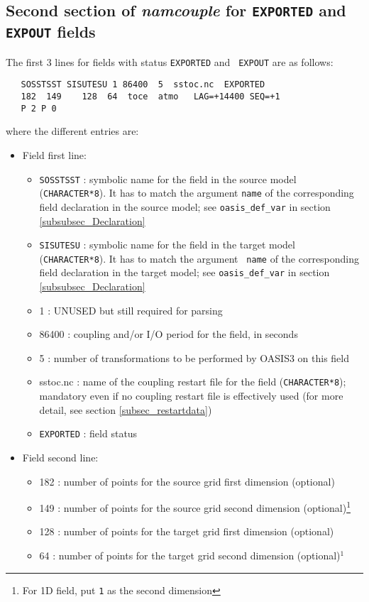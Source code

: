 \subsection{Second section of {\it namcouple} for {\tt EXPORTED} and
  {\tt EXPOUT} fields}
\label{subsubsec_secondEXPORTED}

The first 3 lines for fields with status {\tt EXPORTED} and {\tt
  EXPOUT} are as follows:
  \begin{verbatim}
   SOSSTSST SISUTESU 1 86400  5  sstoc.nc  EXPORTED
   182  149    128  64  toce  atmo   LAG=+14400 SEQ=+1
   P 2 P 0 
\end{verbatim}
where the different entries are:
\begin{itemize}
\item Field first line:
  \begin{itemize}
  \item {\tt SOSSTSST} : symbolic name for the field in the source
    model ({\tt CHARACTER*8}). It has to match the argument {\tt name}
    of the corresponding field declaration in the source model; see
    {\tt oasis\_def\_var} in section \ref{subsubsec_Declaration}
  \item {\tt SISUTESU} : symbolic name for the field in the target
    model ({\tt CHARACTER*8}).  It has to match the argument {\tt
      name} of the corresponding field declaration in the target
    model; see {\tt oasis\_def\_var} in section
    \ref{subsubsec_Declaration}
  \item 1 : UNUSED but still required for parsing
  \item 86400 : coupling and/or I/O period for the field, in seconds
  \item 5 : number of transformations to be performed by OASIS3 on
    this field
  \item sstoc.nc : name of the coupling restart file for the field
    ({\tt CHARACTER*8}); mandatory even if no coupling restart file is
    effectively used (for more detail, see section
    \ref{subsec_restartdata})
  \item {\tt EXPORTED} : field status
  \end{itemize}
\item Field second line:
  \begin{itemize}
  \item 182 : number of points for the source grid first dimension
    (optional)
  \item 149 : number of points for the source grid second dimension
    (optional)\footnote{For 1D field, put {\tt 1} as the second dimension}
  \item 128 : number of points for the target grid first dimension
    (optional)
  \item 64 : number of points for the target grid second dimension
    (optional)$^{1}$


\end{itemize}
\end{itemize}
